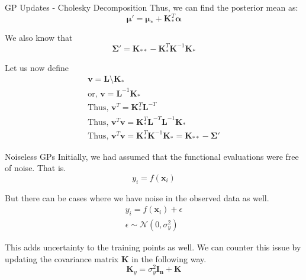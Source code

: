 \documentclass{beamer}
\begin{document}
	\begin{frame}{GP Updates - Cholesky Decomposition}
	Thus, we can find the posterior mean as:
	$$\bm{\mu'} = \bm{\mu}_* + \mathbf{K}_*^T \bm{\alpha}$$
	
	We also know that
	$$\bm{\Sigma'} = \mathbf{K}_{**} - \mathbf{K}_*^T\mathbf{K}^{-1}\mathbf{K}_*$$
	
	Let us now define
	\begin{gather}
	\mathbf{v} = \mathbf{L} \setminus \mathbf{K}_{*}\\
	\text{or, } \mathbf{v} = \mathbf{L}^{-1}\mathbf{K}_{*}\\
	\text{Thus, } \mathbf{v}^{T} = \mathbf{K}_{*}^T\mathbf{L}^{-T}\\
	\text{Thus, } \mathbf{v}^{T}\mathbf{v} = \mathbf{K}_{*}^T\mathbf{L}^{-T}\mathbf{L}^{-1}\mathbf{K}_{*}\\
	\text{Thus, } \mathbf{v}^{T}\mathbf{v} = \mathbf{K}_*^T\mathbf{K}^{-1}\mathbf{K}_* = \mathbf{K}_{**} - \bm{\Sigma'}
	\end{gather}
	
\end{frame}

\begin{frame}{Noiseless GPs}
    Initially, we had assumed that the functional evaluations were free of noise. That is.
	$$y_i = f(\mathbf{x}_i)$$
	
	But there can be cases where we have noise in the observed data as well.
	\begin{gather}
	y_i = f(\mathbf{x}_i) + \epsilon \\
	\epsilon \sim \mathcal{N}(0, \sigma_y^2)
	\end{gather}
	
	This adds uncertainty to the training points as well. We can counter this issue by updating the covariance matrix $\mathbf{K}$ in the following way.
	$$\mathbf{K}_y = \sigma_y^2\mathbf{I_n} + \mathbf{K}$$	
\end{frame}
\end{document}
